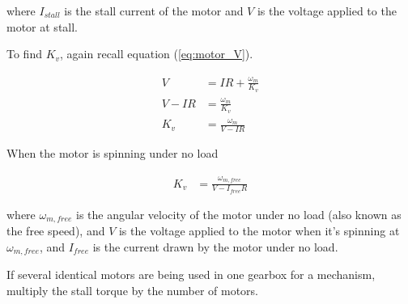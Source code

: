 where $I_{stall}$ is the stall current of the motor and $V$ is the voltage
applied to the motor at stall.

To find $K_v$, again recall equation (\ref{eq:motor_V}).

\begin{align*}
  V &= IR + \frac{\omega_m}{K_v} \\
  V - IR &= \frac{\omega_m}{K_v} \\
  K_v &= \frac{\omega_m}{V - IR}
\end{align*}

When the motor is spinning under no load

\begin{align}
  K_v &= \frac{\omega_{m,free}}{V - I_{free}R}
\end{align}

where $\omega_{m,free}$ is the angular velocity of the motor under no load (also
known as the free speed), and $V$ is the voltage applied to the motor when it's
spinning at $\omega_{m,free}$, and $I_{free}$ is the current drawn by the motor
under no load.

If several identical motors are being used in one gearbox for a mechanism,
multiply the stall torque by the number of motors.

